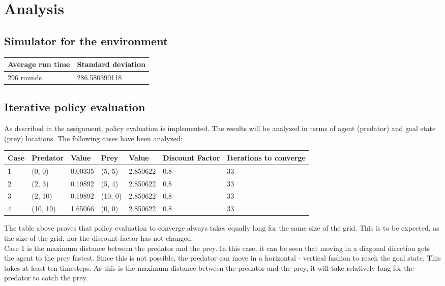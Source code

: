 \documentclass{article}
\begin{document}
\section*{Analysis}


\subsection*{Simulator for the environment}


\begin{center}
	\begin{tabular}{  l ||  l }
		Average run time & Standard deviation \\ 
		\hline
		296 rounds &  286.580390118 %
	\end{tabular}
\end{center}

\subsection*{Iterative policy evaluation}
As described in the assignment, policy evaluation is implemented. The results will be analyzed in terms of agent (predator) and goal state (prey) locations. The following cases have been analyzed: 
\begin{center}
	\begin{tabular}{ |l | l | l | l | l | l | l| }
		Case & Predator & Value & Prey & Value & Discount Factor & Iterations to converge \\ 
		\hline
		1 & (0, 0) & 0.00335 & (5, 5) & 2.850622 & 0.8 & 33 \\
		2 & (2, 3) & 0.19892 & (5, 4) & 2.850622 & 0.8 & 33 \\
		3 & (2, 10) & 0.19892 & (10, 0) & 2.850622 & 0.8 & 33 \\
		4 & (10, 10) & 1.65066 & (0, 0) & 2.850622 & 0.8 & 33 \\	
	\end{tabular}
\end{center}

The table above proves that policy evaluation to converge always takes equally long for the same size of the grid. This is to be expected, as the size of the grid, nor the discount factor has not changed.\\

Case 1 is the maximum distance between the predator and the prey. In this case, it can be seen that moving in a diagonal direction gets the agent to the prey fastest. Since this is not possible, the predator can move in a horizontal - vertical fashion to reach the goal state. This takes at least ten timesteps. As this is the maximum distance between the predator and the prey, it will take relatively long for the predator to catch the prey. \\
\end{document}
